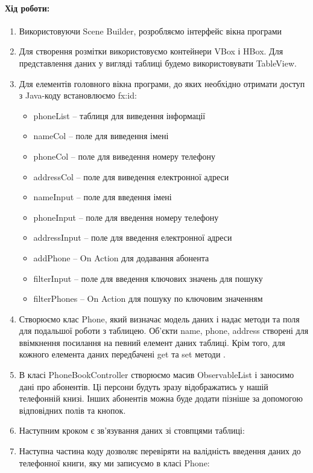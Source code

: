 \paragraph{Хід роботи:}
\begin{enumerate}
	
	\item Використовуючи Scene Builder, розробляємо інтерфейс вікна програми
	\item Для створення розмітки використовуємо контейнери VBox і HBox. Для представлення даних у вигляді таблиці будемо використовувати TableView.
	\item Для елементів головного вікна програми, до яких необхідно отримати доступ з Java-коду встановлюємо fx:id:
	\begin{itemize}
		\item phoneList – таблиця для виведення інформації
		\item nameCol – поле для виведення імені
		\item phoneCol – поле для виведення номеру телефону
		\item addressCol – поле для виведення електронної адреси
		\item nameInput – поле для введення імені
		\item phoneInput – поле для введення номеру телефону
		\item addressInput – поле для введення електронної адреси
		\item addPhone – On Action для додавання абонента
		\item filterInput – поле для введення ключових значень для пошуку
		\item filterPhones – On Action для пошуку по ключовим значенням
	\end{itemize}
	\item Створюємо клас Phone, який визначає модель даних і надає методи та поля для подальшої роботи з таблицею.
		Об’єкти name, phone, address створені для ввімкнення посилання на певний елемент даних таблиці. Крім того, для кожного елемента даних передбачені get та set методи .
		\item В класі PhoneBookController створюємо масив ObservableList і заносимо дані про абонентів. Ці персони будуть зразу відображатись у нашій телефонній книзі. Інших абонентів можна буде додати пізніше за допомогою відповідних полів та кнопок.
		\item Наступним кроком є зв’язування даних зі стовпцями таблиці:
		\item Наступна частина коду дозволяє перевіряти на валідність введення даних до телефонної книги, яку ми записуємо в класі Phone:

\end{enumerate}
